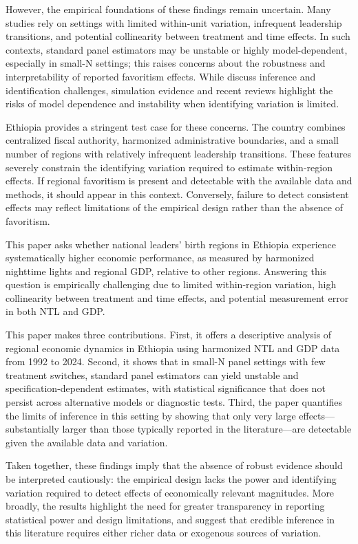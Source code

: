 \documentclass[12pt,a4paper]{article}
\begin{document}
However, the empirical foundations of these findings remain uncertain. Many studies rely on settings with limited within-unit variation, infrequent leadership transitions, and potential collinearity between treatment and time effects. In such contexts, standard panel estimators may be unstable or highly model-dependent, especially in small-N settings; this raises concerns about the robustness and interpretability of reported favoritism effects. While \citet{Bertrand2004, Angrist2009, Imbens2015} discuss inference and identification challenges, simulation evidence and recent reviews highlight the risks of model dependence and instability when identifying variation is limited.

Ethiopia provides a stringent test case for these concerns. The country combines centralized fiscal authority, harmonized administrative boundaries, and a small number of regions with relatively infrequent leadership transitions. These features severely constrain the identifying variation required to estimate within-region effects. If regional favoritism is present and detectable with the available data and methods, it should appear in this context. Conversely, failure to detect consistent effects may reflect limitations of the empirical design rather than the absence of favoritism.

This paper asks whether national leaders’ birth regions in Ethiopia experience systematically higher economic performance, as measured by harmonized nighttime lights and regional GDP, relative to other regions. Answering this question is empirically challenging due to limited within-region variation, high collinearity between treatment and time effects, and potential measurement error in both NTL and GDP.

This paper makes three contributions. First, it offers a descriptive analysis of regional economic dynamics in Ethiopia using harmonized NTL and GDP data from 1992 to 2024. Second, it shows that in small-N panel settings with few treatment switches, standard panel estimators can yield unstable and specification-dependent estimates, with statistical significance that does not persist across alternative models or diagnostic tests. Third, the paper quantifies the limits of inference in this setting by showing that only very large effects—substantially larger than those typically reported in the literature—are detectable given the available data and variation.

Taken together, these findings imply that the absence of robust evidence should be interpreted cautiously: the empirical design lacks the power and identifying variation required to detect effects of economically relevant magnitudes. More broadly, the results highlight the need for greater transparency in reporting statistical power and design limitations, and suggest that credible inference in this literature requires either richer data or exogenous sources of variation.
\end{document}
